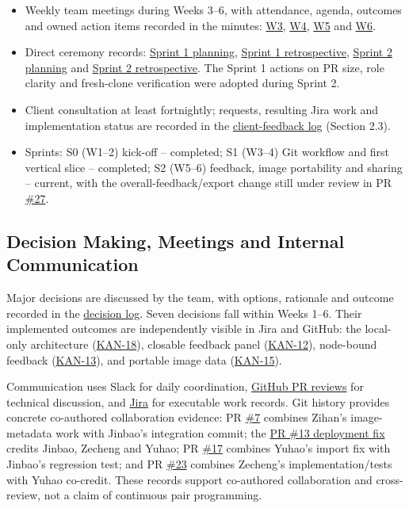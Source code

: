 \documentclass[10pt,a4paper]{article}
\newcommand{\ghbase}{https://github.com/lkevincc0/mm-local-editor}
\newcommand{\PR}[1]{\href{\ghbase/pull/#1}{\##1}}
\newcommand{\jirabase}{https://student-team-zvzgb5e3.atlassian.net}
\newcommand{\JIRA}[1]{\href{\jirabase/browse/KAN-#1}{KAN-#1}}
\newcommand{\wikibase}{https://student-team-zvzgb5e3.atlassian.net/wiki/spaces/~7120206e0163ea5d37428b992775145124d7e8/pages/}
\newcommand{\wpage}[2]{\href{\wikibase#1}{#2}}
\begin{document}
\begin{itemize}
  \item Weekly team meetings during Weeks 3--6, with attendance, agenda, outcomes and owned action items recorded in the minutes: \wpage{458771}{W3}, \wpage{557224}{W4}, \wpage{557269}{W5} and \wpage{557316}{W6}.
  \item Direct ceremony records: \wpage{524291}{Sprint 1 planning}, \wpage{557355}{Sprint 1 retrospective}, \wpage{458808}{Sprint 2 planning} and \wpage{458855}{Sprint 2 retrospective}. The Sprint 1 actions on PR size, role clarity and fresh-clone verification were adopted during Sprint 2.
  \item Client consultation at least fortnightly; requests, resulting Jira work and implementation status are recorded in the \wpage{524330}{client-feedback log} (Section 2.3).
  \item Sprints: S0 (W1--2) kick-off -- completed; S1 (W3--4) Git workflow and first vertical slice -- completed; S2 (W5--6) feedback, image portability and sharing -- current, with the overall-feedback/export change still under review in PR \PR{27}.
\end{itemize}

\subsection{Decision Making, Meetings and Internal Communication}
Major decisions are discussed by the team, with options, rationale and outcome recorded in the \wpage{557378}{decision log}. Seven decisions fall within Weeks 1--6. Their implemented outcomes are independently visible in Jira and GitHub: the local-only architecture (\JIRA{18}), closable feedback panel (\JIRA{12}), node-bound feedback (\JIRA{13}), and portable image data (\JIRA{15}).

Communication uses Slack for daily coordination, \href{\ghbase/pulls?q=is:pr}{GitHub PR reviews} for technical discussion, and \href{\jirabase/jira/software/projects/KAN/boards/1}{Jira} for executable work records. Git history provides concrete co-authored collaboration evidence: PR \PR{7} combines Zihan's image-metadata work with Jinbao's integration commit; the \href{https://github.com/lkevincc0/mm-local-editor/commit/054878f16a4fb59cdbfc4fe5028ce4c008b360e9}{PR \#13 deployment fix} credits Jinbao, Zecheng and Yuhao; PR \PR{17} combines Yuhao's import fix with Jinbao's regression test; and PR \PR{23} combines Zecheng's implementation/tests with Yuhao co-credit. These records support co-authored collaboration and cross-review, not a claim of continuous pair programming.
\end{document}
